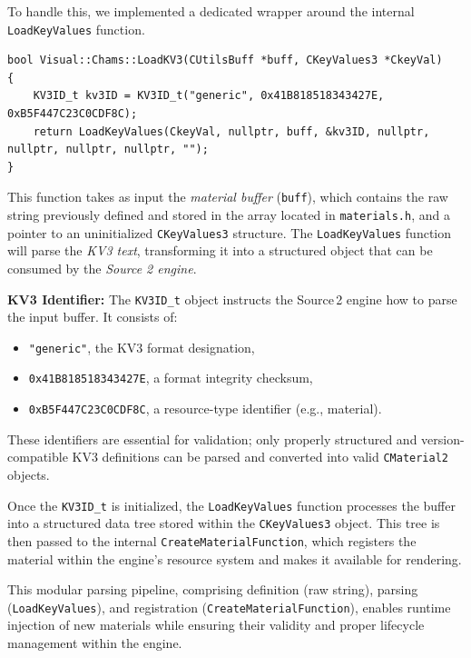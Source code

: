 \newpage
To handle this, we implemented a dedicated wrapper around the internal \texttt{LoadKeyValues} function.

\begin{lstlisting}[style=cppstyle, caption={Loading a KV3 Material into the Game}]
bool Visual::Chams::LoadKV3(CUtilsBuff *buff, CKeyValues3 *CkeyVal) 
{
    KV3ID_t kv3ID = KV3ID_t("generic", 0x41B818518343427E, 0xB5F447C23C0CDF8C);
    return LoadKeyValues(CkeyVal, nullptr, buff, &kv3ID, nullptr, nullptr, nullptr, nullptr, "");
}
\end{lstlisting}

This function takes as input the \textit{material buffer} (\texttt{buff}), which contains the raw string previously defined and stored in the array located in \texttt{materials.h}, and a pointer to an uninitialized \texttt{CKeyValues3} structure. The \texttt{LoadKeyValues} function will parse the \textit{KV3 text}, transforming it into a structured object that can be consumed by the \textit{Source 2 engine}.

\begin{tcolorbox}[colback=gray!05, colframe=gray!50, sharp corners, boxrule=0pt]
\textbf{KV3 Identifier:}  
The \texttt{KV3ID\_t} object instructs the Source 2 engine how to parse the input buffer. It consists of:

\begin{itemize}
  \item \texttt{"generic"}, the KV3 format designation,
  \item \texttt{0x41B818518343427E}, a format integrity checksum,
  \item \texttt{0xB5F447C23C0CDF8C}, a resource-type identifier (e.g., material).
\end{itemize}

These identifiers are essential for validation; only properly structured and version-compatible KV3 definitions can be parsed and converted into valid \texttt{CMaterial2} objects.
\end{tcolorbox}

Once the \texttt{KV3ID\_t} is initialized, the \texttt{LoadKeyValues} function processes the buffer into a structured data tree stored within the \texttt{CKeyValues3} object. This tree is then passed to the internal \texttt{CreateMaterialFunction}, which registers the material within the engine's resource system and makes it available for rendering.

This modular parsing pipeline, comprising definition (raw string), parsing (\texttt{LoadKeyValues}), and registration (\texttt{CreateMaterialFunction}), enables runtime injection of new materials while ensuring their validity and proper lifecycle management within the engine.

